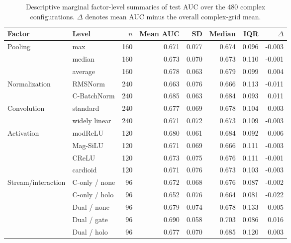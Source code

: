 \begin{table}[t]
\centering
\caption{Descriptive marginal factor-level summaries of test AUC over the 480 complex configurations. $\Delta$ denotes mean AUC minus the overall complex-grid mean.}
\label{tab:factor-effects-marginal}
\small
\begin{tabular}{llrrrrrr}
\toprule
Factor & Level & $n$ & Mean AUC & SD & Median & IQR & $\Delta$ \\
\midrule
Pooling & max & 160 & 0.671 & 0.077 & 0.674 & 0.096 & -0.003 \\
 & median & 160 & 0.673 & 0.070 & 0.673 & 0.110 & -0.001 \\
 & average & 160 & 0.678 & 0.063 & 0.679 & 0.099 & 0.004 \\
Normalization & RMSNorm & 240 & 0.663 & 0.076 & 0.666 & 0.113 & -0.011 \\
 & C-BatchNorm & 240 & 0.685 & 0.063 & 0.684 & 0.093 & 0.011 \\
Convolution & standard & 240 & 0.677 & 0.069 & 0.678 & 0.104 & 0.003 \\
 & widely linear & 240 & 0.671 & 0.072 & 0.673 & 0.109 & -0.003 \\
Activation & modReLU & 120 & 0.680 & 0.061 & 0.684 & 0.092 & 0.006 \\
 & Mag-SiLU & 120 & 0.671 & 0.069 & 0.666 & 0.111 & -0.003 \\
 & CReLU & 120 & 0.673 & 0.075 & 0.676 & 0.111 & -0.001 \\
 & cardioid & 120 & 0.671 & 0.076 & 0.673 & 0.103 & -0.003 \\
Stream/interaction & C-only / none & 96 & 0.672 & 0.068 & 0.676 & 0.087 & -0.002 \\
 & C-only / holo & 96 & 0.652 & 0.076 & 0.664 & 0.081 & -0.022 \\
 & Dual / none & 96 & 0.679 & 0.074 & 0.678 & 0.133 & 0.005 \\
 & Dual / gate & 96 & 0.690 & 0.058 & 0.703 & 0.086 & 0.016 \\
 & Dual / holo & 96 & 0.677 & 0.070 & 0.685 & 0.120 & 0.003 \\
\bottomrule
\end{tabular}
\end{table}
